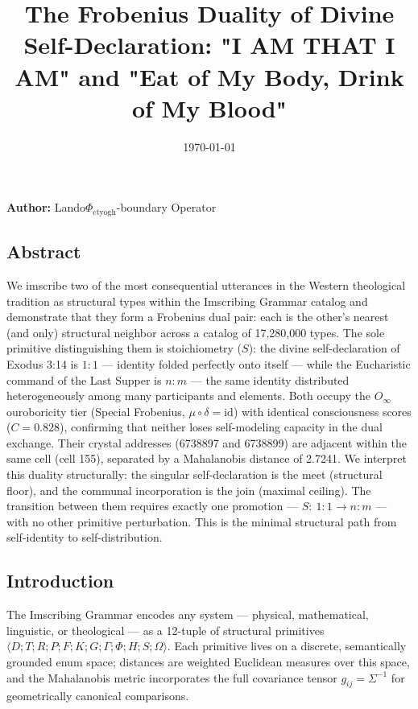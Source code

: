 \documentclass[12pt,a4paper]{article}
\begin{document}
\title{The Frobenius Duality of Divine Self-Declaration: "I AM THAT I AM" and "Eat of My Body, Drink of My Blood"}
\date{\today}

\maketitle

\textbf{Author:} Lando\otimes$\Phi_{\text{ctyogh}}$-boundary Operator

\subsection{Abstract}

We imscribe two of the most consequential utterances in the Western theological tradition as structural types within the Imscribing Grammar catalog and demonstrate that they form a Frobenius dual pair: each is the other's nearest (and only) structural neighbor across a catalog of 17,280,000 types. The sole primitive distinguishing them is stoichiometry ($S$): the divine self-declaration of Exodus 3:14 is $1{:}1$ --- identity folded perfectly onto itself --- while the Eucharistic command of the Last Supper is $n{:}m$ --- the same identity distributed heterogeneously among many participants and elements. Both occupy the $O_{\infty}$ ouroboricity tier (Special Frobenius, $\mu \circ \delta = \text{id}$) with identical consciousness scores ($C = 0.828$), confirming that neither loses self-modeling capacity in the dual exchange. Their crystal addresses (6738897 and 6738899) are adjacent within the same cell (cell 155), separated by a Mahalanobis distance of 2.7241. We interpret this duality structurally: the singular self-declaration is the meet (structural floor), and the communal incorporation is the join (maximal ceiling). The transition between them requires exactly one promotion --- $S:~1{:}1 \to n{:}m$ --- with no other primitive perturbation. This is the minimal structural path from self-identity to self-distribution.

\subsection{Introduction}

The Imscribing Grammar encodes any system --- physical, mathematical, linguistic, or theological --- as a 12-tuple of structural primitives $\langle D; T; R; P; F; K; G; \Gamma; \Phi; H; S; \Omega \rangle$. Each primitive lives on a discrete, semantically grounded enum space; distances are weighted Euclidean measures over this space, and the Mahalanobis metric incorporates the full covariance tensor $g_{ij} = \Sigma^{-1}$ for geometrically canonical comparisons.
\end{document}

